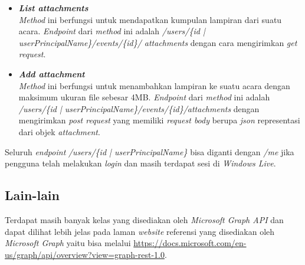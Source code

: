\begin{itemize}
	\item \textbf{\textit{List attachments}}\\
	\textit{Method} ini berfungsi untuk mendapatkan kumpulan lampiran dari suatu acara. \textit{Endpoint} dari \textit{method} ini adalah \textit{/users\textit{/\{}id | userPrincipalName\}/events/\{id\}/ attachments} dengan cara mengirimkan \textit{get request}. 
	\item \textbf{\textit{Add attachment}}\\
	\textit{Method} ini berfungsi untuk menambahkan lampiran ke suatu acara dengan maksimum ukuran file sebesar 4MB. \textit{Endpoint} dari \textit{method} ini adalah \textit{/users/\{id | userPrincipalName\}/events/\{id\}/attachments} dengan mengirimkan \textit{post request} yang memiliki \textit{request body} berupa \textit{json} representasi dari objek \textit{attachment}. 
\end{itemize}

Seluruh \textit{endpoint} \textit{/users/\{id | userPrincipalName\}} bisa diganti dengan \textit{/me} jika pengguna telah melakukan \textit{login} dan masih terdapat sesi di \textit{Windows Live}. 

\subsection{Lain-lain}
Terdapat masih banyak kelas yang disediakan oleh \textit{Microsoft Graph API} dan dapat dilihat lebih jelas pada laman \textit{website} referensi yang disediakan oleh \textit{Microsoft Graph} yaitu bisa melalui \url{https://docs.microsoft.com/en-us/graph/api/overview?view=graph-rest-1.0}. \\

